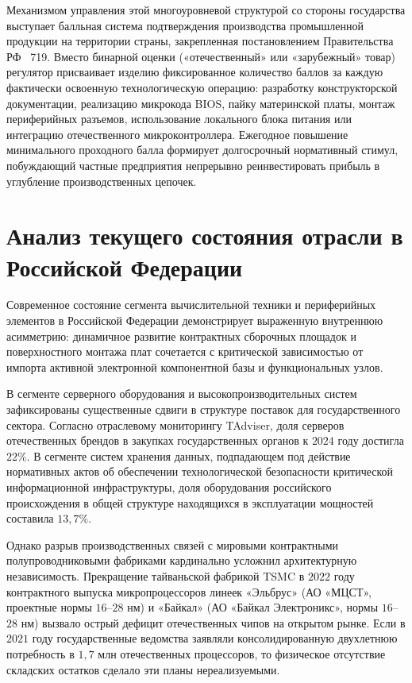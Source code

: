 \documentclass[12pt,a4paper]{article}
\begin{document}
Механизмом управления этой многоуровневой структурой со стороны 
государства выступает балльная система подтверждения производства 
промышленной продукции на территории страны, закрепленная 
постановлением Правительства РФ \textnumero~719. Вместо бинарной 
оценки («отечественный» или «зарубежный» товар) регулятор присваивает 
изделию фиксированное количество баллов за каждую фактически 
освоенную технологическую операцию: разработку конструкторской 
документации, реализацию микрокода BIOS, пайку материнской платы, 
монтаж периферийных разъемов, использование локального блока питания 
или интеграцию отечественного микроконтроллера. Ежегодное повышение 
минимального проходного балла формирует долгосрочный нормативный 
стимул, побуждающий частные предприятия непрерывно реинвестировать 
прибыль в углубление производственных цепочек.

\section{Анализ текущего состояния отрасли в Российской Федерации}

Современное состояние сегмента вычислительной техники и периферийных 
элементов в Российской Федерации демонстрирует выраженную внутреннюю 
асимметрию: динамичное развитие контрактных сборочных площадок и 
поверхностного монтажа плат сочетается с критической зависимостью от 
импорта активной электронной компонентной базы и функциональных узлов.

В сегменте серверного оборудования и высокопроизводительных систем 
зафиксированы существенные сдвиги в структуре поставок для 
государственного сектора. Согласно отраслевому мониторингу TAdviser, 
доля серверов отечественных брендов в закупках государственных 
органов к $2024$ году достигла $22\%$. В сегменте систем хранения 
данных, подпадающем под действие нормативных актов об обеспечении 
технологической безопасности критической информационной инфраструктуры, 
доля оборудования российского происхождения в общей структуре 
находящихся в эксплуатации мощностей составила $13{,}7\%$.

Однако разрыв производственных связей с мировыми контрактными 
полупроводниковыми фабриками кардинально усложнил архитектурную 
независимость. Прекращение тайваньской фабрикой TSMC в $2022$ году 
контрактного выпуска микропроцессоров линеек «Эльбрус» 
(АО «МЦСТ», проектные нормы $16$--$28$ нм) и «Байкал» 
(АО «Байкал Электроникс», нормы $16$--$28$ нм) вызвало острый 
дефицит отечественных чипов на открытом рынке. Если в $2021$ году 
государственные ведомства заявляли консолидированную двухлетнюю 
потребность в $1{,}7\text{ млн}$ отечественных процессоров, то 
физическое отсутствие складских остатков сделало эти планы 
нереализуемыми.
\end{document}
